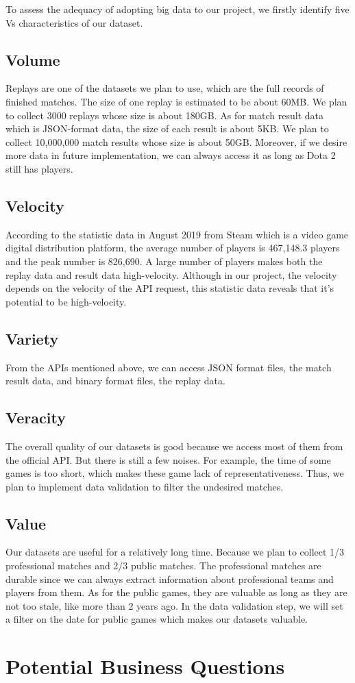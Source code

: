 \documentclass{article}
\newcommand{\bigdataVs}[1]{
	\subsection{#1}
}
\begin{document}
To assess the adequacy of adopting big data to our project, we firstly identify five Vs characteristics of our dataset.

\bigdataVs{Volume}

Replays are one of the datasets we plan to use, which are the full records of finished matches. The size of one replay is estimated to be about 60MB. We plan to collect 3000 replays whose size is about 180GB. As for match result data which is JSON-format data, the size of each result is about 5KB. We plan to collect 10,000,000 match results whose size is about 50GB. Moreover, if we desire more data in future implementation, we can always access it as long as Dota 2 still has players.

\bigdataVs{Velocity}

According to the statistic data in August 2019 from Steam which is a video game digital distribution platform, the average number of players is 467,148.3 players and the peak number is 826,690.
A large number of players makes both the replay data and result data high-velocity.
Although in our project, the velocity depends on the velocity of the API request, this statistic data reveals that it's potential to be high-velocity.

\bigdataVs{Variety}

From the APIs mentioned above, we can access JSON format files, the match result data, and binary format files, the replay data.

\bigdataVs{Veracity}

The overall quality of our datasets is good because we access most of them from the official API.
But there is still a few noises.
For example, the time of some games is too short, which makes these game lack of representativeness.
Thus, we plan to implement data validation to filter the undesired matches.

\bigdataVs{Value}

Our datasets are useful for a relatively long time.
Because we plan to collect 1/3 professional matches and 2/3 public matches.
The professional matches are durable since we can always extract information about professional teams and players from them.
As for the public games, they are valuable as long as they are not too stale, like more than 2 years ago.
In the data validation step, we will set a filter on the date for public games which makes our datasets valuable.

\section{Potential Business Questions}
\end{document}
